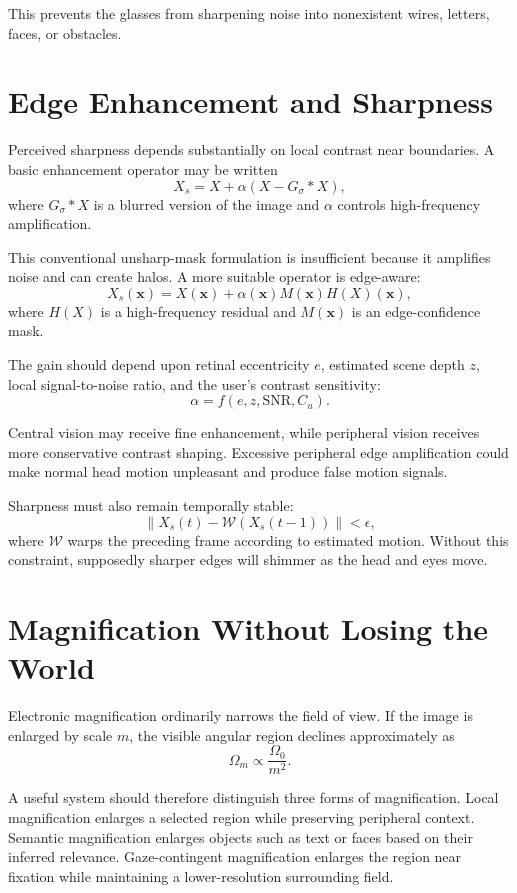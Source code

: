 \documentclass[11pt]{article}
\begin{document}
This prevents the glasses from sharpening noise into nonexistent wires, letters, faces, or obstacles.

\section{Edge Enhancement and Sharpness}

Perceived sharpness depends substantially on local contrast near boundaries. A basic enhancement operator may be written
\[
X_s=X+\alpha(X-G_\sigma * X),
\]
where $G_\sigma * X$ is a blurred version of the image and $\alpha$ controls high-frequency amplification.

This conventional unsharp-mask formulation is insufficient because it amplifies noise and can create halos. A more suitable operator is edge-aware:
\[
X_s(\mathbf{x})=X(\mathbf{x})+\alpha(\mathbf{x})M(\mathbf{x})H(X)(\mathbf{x}),
\]
where $H(X)$ is a high-frequency residual and $M(\mathbf{x})$ is an edge-confidence mask.

The gain should depend upon retinal eccentricity $e$, estimated scene depth $z$, local signal-to-noise ratio, and the user's contrast sensitivity:
\[
\alpha=f(e,z,\mathrm{SNR},C_u).
\]

Central vision may receive fine enhancement, while peripheral vision receives more conservative contrast shaping. Excessive peripheral edge amplification could make normal head motion unpleasant and produce false motion signals.

Sharpness must also remain temporally stable:
\[
\|X_s(t)-\mathcal{W}(X_s(t-1))\|<\epsilon,
\]
where $\mathcal{W}$ warps the preceding frame according to estimated motion. Without this constraint, supposedly sharper edges will shimmer as the head and eyes move.

\section{Magnification Without Losing the World}

Electronic magnification ordinarily narrows the field of view. If the image is enlarged by scale $m$, the visible angular region declines approximately as
\[
\Omega_m\propto\frac{\Omega_0}{m^2}.
\]

A useful system should therefore distinguish three forms of magnification. Local magnification enlarges a selected region while preserving peripheral context. Semantic magnification enlarges objects such as text or faces based on their inferred relevance. Gaze-contingent magnification enlarges the region near fixation while maintaining a lower-resolution surrounding field.
\end{document}

